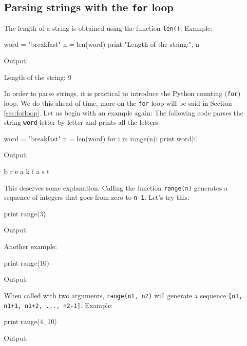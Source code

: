 \subsection{Parsing strings with the {\tt for} loop}\label{subsec:forstr} 

The length of a string is obtained using the function {\tt len()}.
Example:

\begin{bluecode}
word = "breakfast"
n = len(word)
print "Length of the string:", n
\end{bluecode}
Output:

\begin{bluecode}
Length of the string: 9
\end{bluecode}
In order to parse strings, it is practical to introduce the Python counting 
({\tt for}) loop. We do this ahead of time, more on the {\tt for} loop will 
be said in Section \ref{sec:forloop}. Let us begin with an example again: The
following code parses the string {\tt word} letter by letter and prints all
the letters:

\begin{bluecode}
word = "breakfast"
n = len(word)
for i in range(n):
    print word[i]
\end{bluecode}
Output:

\begin{bluecode}
b
r
e
a
k
f
a
s
t
\end{bluecode}
This deserves some explanation. Calling the function {\tt range(n)} generates 
a sequence of integers that goes from zero to {\tt n-1}. Let's try this:

\begin{bluecode}
print range(3)
\end{bluecode}
Output:

\begin{bluecode}
[0, 1, 2]
\end{bluecode}
Another example:

\begin{bluecode}
print range(10)
\end{bluecode}
Output:

\begin{bluecode}
[0, 1, 2, 3, 4, 5, 6, 7, 8, 9]
\end{bluecode}
When called with two arguments, {\tt range(n1, n2)} will generate 
a sequence {\tt [n1, n1+1, n1+2, ..., n2-1]}. Example:

\begin{bluecode}
print range(4, 10)
\end{bluecode}
Output:

